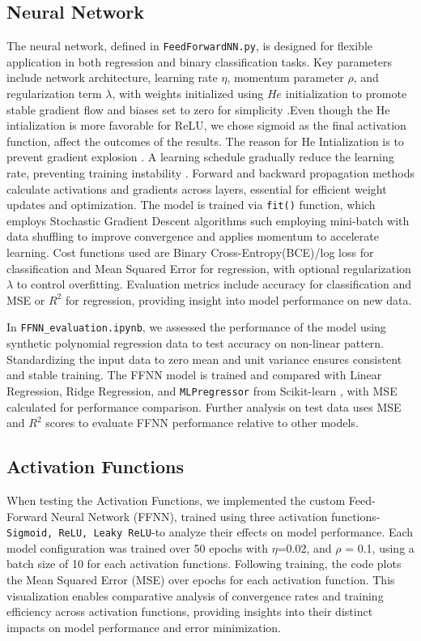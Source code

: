 \documentclass{article}
\newcommand{\0}{\mathbf{0}}
\newcommand{\1}{\mathbf{1}}
\begin{document}
\subsection{Neural Network}
The neural network, defined in \texttt{FeedForwardNN.py}, is designed for flexible application in both regression and binary classification tasks. Key parameters include network architecture, learning rate \(\eta\), momentum parameter \(\rho\), and regularization term \(\lambda\), with weights initialized using \(He\) initialization to promote stable gradient flow and biases set to zero for simplicity \cite{HeInitialization}.Even though the He intialization is more favorable for ReLU, we chose sigmoid as the final activation function, affect the outcomes of the results. The reason for He Intialization is to prevent gradient explosion \cite{HeInitialization}. A learning schedule gradually reduce the learning rate, preventing training instability \cite{LearningSchdule}. Forward and backward propagation methods calculate activations and gradients across layers, essential for efficient weight updates and optimization. 
The model is trained via \texttt{fit()} function, which employs Stochastic Gradient Descent algorithms such employing mini-batch with data shuffling to improve convergence and applies momentum to accelerate learning. Cost functions used are Binary Cross-Entropy(BCE)/log loss for classification and Mean Squared Error for regression, with optional regularization \(\lambda\) to control overfitting. Evaluation metrics include accuracy for classification and MSE or \(R^2\) for regression, providing insight into model performance on new data. 

In \texttt{FFNN\_evaluation.ipynb}, we assessed the performance of the model using synthetic polynomial regression data to test accuracy on non-linear pattern. Standardizing the input data to zero mean and unit variance ensures consistent and stable training. The FFNN model is trained and compared with Linear Regression, Ridge Regression, and \texttt{MLPregressor} from Scikit-learn \cite{pedregosa2011scikit}, with MSE calculated for performance comparison. Further analysis on test data uses MSE and \(R^2\) scores to evaluate FFNN performance relative to other models. 


\subsection{Activation Functions}
When testing the Activation Functions, we implemented the custom Feed-Forward Neural Network (FFNN), trained using three activation functions- \texttt{Sigmoid, ReLU, Leaky ReLU}-to analyze their effects on model performance. Each model configuration was trained over 50 epochs with \(\eta\)=0.02, and \(\rho\) = 0.1, using a batch size of 10 for each activation functions. Following training, the code plots the Mean Squared Error (MSE) over epochs for each activation function. This visualization enables comparative analysis of convergence rates and training efficiency across activation functions, providing insights into their distinct impacts on model performance  and error minimization. 
\end{document}
